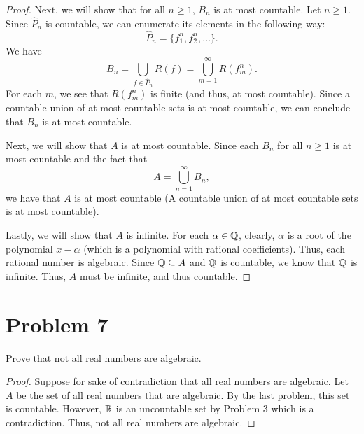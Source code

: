 \documentclass[11pt,a4paper]{article}
\begin{document}
\begin{proof}
    Next, we will show that for all \( n \geq 1  \), \( {B}_{n}  \) is at most countable. Let \( n \geq 1  \). Since \( {\hat{P}}_{n} \) is countable, we can enumerate its elements in the following way:
    \[  {\hat{P}}_{n} = \{ {f}_{1}^{n}, {f}_{2}^{n}, \dots  \}. \]
    We have 
    \[  {B}_{n} = \bigcup_{ f \in {\hat{P}}_{n} }^{  }  R(f) = \bigcup_{ m=1  }^{ \infty  }  R({f}_{m}^{n}). \]
    For each \( m  \), we see that \( R({f}_{m}^{n}) \) is finite (and thus, at most countable). Since a countable union of at most countable sets is at most countable, we can conclude that \( {B}_{n} \) is at most countable. 

    Next, we will show that \( A  \) is at most countable. Since each \( {B}_{n} \) for all \( n \geq 1  \) is at most countable and the fact that
    \[  A = \bigcup_{ n = 1  }^{ \infty  }  {B}_{n}, \]
    we have that \( A  \) is at most countable (A countable union of at most countable sets is at most countable). 

    Lastly, we will show that \( A  \) is infinite. For each \( \alpha \in \mathbb{Q}  \), clearly, \( \alpha  \) is a root of the polynomial \( x - \alpha  \) (which is a polynomial with rational coefficients). Thus, each rational number is algebraic. Since \( \mathbb{Q} \subseteq  A   \) and \( \mathbb{Q}  \) is countable, we know that \( \mathbb{Q}  \) is infinite. Thus, \( A  \) must be infinite, and thus countable.    
\end{proof} 


\section*{Problem 7} Prove that not all real numbers are algebraic.
\begin{proof}
    Suppose for sake of contradiction that all real numbers are algebraic. Let \( A  \) be the set of all real numbers that are algebraic. By the last problem, this set is countable. However, \( \mathbb{R}  \) is an uncountable set by Problem 3 which is a contradiction. Thus, not all real numbers are algebraic.  
\end{proof}
\end{document}
